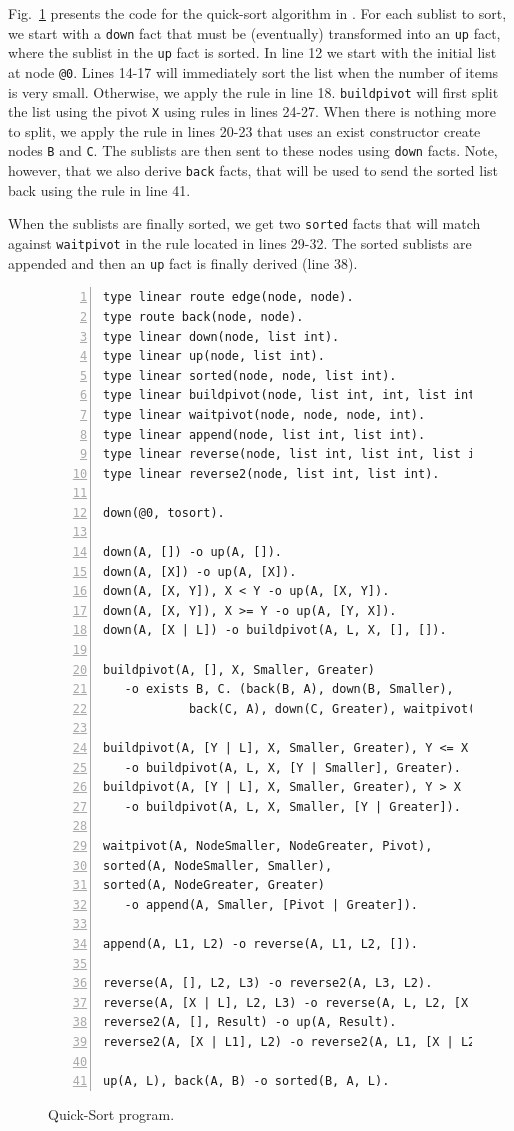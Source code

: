 Fig.~\ref{code:quicksort} presents the code for the quick-sort algorithm in \lang.
For each sublist to sort, we start with a \texttt{down} fact that must be (eventually)
transformed into an \texttt{up} fact, where the sublist in the \texttt{up} fact is sorted.
In line 12 we start with the initial list at node \texttt{@0}. Lines 14-17 will immediately
sort the list when the number of items is very small. Otherwise, we apply the rule in line 18.
\texttt{buildpivot} will first split the list using the pivot \texttt{X} using rules in
lines 24-27. When there is nothing more to split, we apply the rule in lines 20-23
that uses an exist constructor create nodes \texttt{B} and \texttt{C}. The sublists
are then sent to these nodes using \texttt{down} facts. Note, however, that we also
derive \texttt{back} facts, that will be used to send the sorted list back using the rule
in line 41.

When the sublists are finally sorted, we get two \texttt{sorted} facts that will match
against \texttt{waitpivot} in the rule located in lines 29-32. The sorted sublists
are appended and then an \texttt{up} fact is finally derived (line 38).

\begin{figure}[h!]
\small\begin{Verbatim}[numbers=left]
type linear route edge(node, node).
type route back(node, node).
type linear down(node, list int).
type linear up(node, list int).
type linear sorted(node, node, list int).
type linear buildpivot(node, list int, int, list int, list int).
type linear waitpivot(node, node, node, int).
type linear append(node, list int, list int).
type linear reverse(node, list int, list int, list int).
type linear reverse2(node, list int, list int).

down(@0, tosort).

down(A, []) -o up(A, []).
down(A, [X]) -o up(A, [X]).
down(A, [X, Y]), X < Y -o up(A, [X, Y]).
down(A, [X, Y]), X >= Y -o up(A, [Y, X]).
down(A, [X | L]) -o buildpivot(A, L, X, [], []).

buildpivot(A, [], X, Smaller, Greater)
   -o exists B, C. (back(B, A), down(B, Smaller),
            back(C, A), down(C, Greater), waitpivot(A, B, C, X)).

buildpivot(A, [Y | L], X, Smaller, Greater), Y <= X
   -o buildpivot(A, L, X, [Y | Smaller], Greater).
buildpivot(A, [Y | L], X, Smaller, Greater), Y > X
   -o buildpivot(A, L, X, Smaller, [Y | Greater]).
   
waitpivot(A, NodeSmaller, NodeGreater, Pivot),
sorted(A, NodeSmaller, Smaller),
sorted(A, NodeGreater, Greater)
   -o append(A, Smaller, [Pivot | Greater]).

append(A, L1, L2) -o reverse(A, L1, L2, []).

reverse(A, [], L2, L3) -o reverse2(A, L3, L2).
reverse(A, [X | L], L2, L3) -o reverse(A, L, L2, [X | L3]).
reverse2(A, [], Result) -o up(A, Result).
reverse2(A, [X | L1], L2) -o reverse2(A, L1, [X | L2]).

up(A, L), back(A, B) -o sorted(B, A, L).
\end{Verbatim}
  \caption{Quick-Sort program.}
  \label{code:quicksort}
\end{figure}
\normalsize

